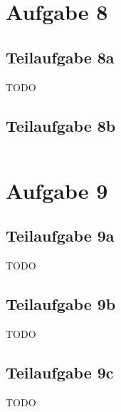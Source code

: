 \documentclass[a4paper]{scrartcl}
\begin{document}
\section*{Aufgabe 8}
\subsection*{Teilaufgabe 8a}
TODO

\subsection*{Teilaufgabe 8b}
\inputminted[linenos, numbersep=5pt, tabsize=4, frame=lines, label=shader.frag]{glsl}{shader.frag}

\section*{Aufgabe 9}
\subsection*{Teilaufgabe 9a}
TODO
\subsection*{Teilaufgabe 9b}
TODO
\subsection*{Teilaufgabe 9c}
TODO
\end{document}
